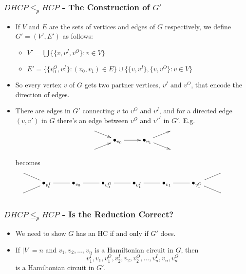 \documentclass[handout]{beamer}
\begin{document}
\begin{frame}
\frametitle{$DHCP\leq_p HCP$ - The Construction of $G'$}
\begin{itemize}
\item If $V$ and $E$ are the sets of vertices and edges of $G$ respectively, we define $G'=(V',E')$ as follows:
\begin{itemize}
\item $V'=\bigcup\{\{v,v^I,v^O\}:v\in V\}$
\item $E'=\{\{v_0^O,v_1^I\} : (v_0,v_1)\in E\} \cup \{\{v,v^I\},\{v,v^O\}:v\in V\}$
\end{itemize}

\item So every vertex $v$ of $G$ gets two partner vertices, $v^I$ and $v^O$, that encode the direction of edges. 
\item There are edges in $G'$ connecting $v$ to $v^O$ and $v^I$, and for a directed edge $(v,v')$ in $G$ there's an edge between $v^O$ and $v'^I$ in $G'$. E.g.
\[\xymatrix@R=0.5em{
\ar[dr]& & &\\
& \bullet_{v_0}\ar[r] &\bullet_{v_1}\ar[ur]\ar[dr] & \\
\ar[ur] & & &}\]
becomes 
\[\xymatrix@R=0.5em{
\ar@{-}[dr] & & & & & & & &\\
& \bullet_{v_0^I}\ar@{-}[r] & \bullet_{v_0}\ar@{-}[r] & \bullet_{v_0^O}\ar@{-}[r] & \bullet_{v_1^I}\ar@{-}[r] & \bullet_{v_1}\ar@{-}[r] & \bullet_{v_1^O}\ar@{-}[ur]\ar@{-}[dr]\\
\ar@{-}[ur] & & & & & & & &}\]
\end{itemize} 
\end{frame}

\begin{frame}
\frametitle{$DHCP\leq_p HCP$ - Is the Reduction Correct?}
\begin{itemize}
\item We need to show $G$ has an HC if and only if $G'$ does. 
\vspace{0.5cm}
\item If $|V|=n$ and $v_1,v_2,\ldots,v_n$ is a Hamiltonian circuit in $G$, then\vspace{0.5cm} 
\begin{equation*}v^I_1,v_1, v^O_1, v_2^I, v_2, v_2^O,\ldots,v_n^I,v_n,v_n^O\end{equation*} 
\vspace{0.5cm}
is a Hamiltonian circuit in $G'$. 
\end{itemize} 
\end{frame}
\end{document}
